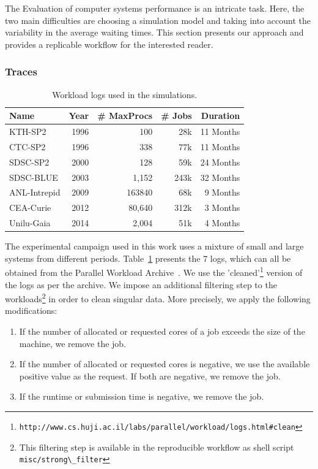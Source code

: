 \documentclass[sigconf]{acmart}
\newcommand{\ra}[1]{\renewcommand{\arraystretch}{#1}}
\begin{document}
The Evaluation of computer systems performance is an intricate
task\cite{feitbook}. Here, the two main difficulties are choosing a simulation
model and taking into account the variability in the average waiting times.
This section presents our approach and provides a replicable workflow
for the interested reader.

\subsubsection{Traces}
\label{sub:traces}

\begin{table}[ht]
  \centering
  \ra{1.3}
  \caption{Workload logs used in the simulations.}
  \label{tab:logs}
  \begin{tabular}{@{}lrrrr@{}}
    \hline
    Name          & Year & \# MaxProcs & \# Jobs & Duration\\
    \hline
    KTH-SP2       & 1996 & 100         & 28k     & 11 Months\\
    CTC-SP2       & 1996 & 338         & 77k     & 11 Months\\
    SDSC-SP2      & 2000 & 128         & 59k     & 24 Months\\
    SDSC-BLUE     & 2003 & 1,152       & 243k    & 32 Months\\
    ANL-Intrepid  & 2009 & 163840      & 68k     & 9  Months\\
    CEA-Curie     & 2012 & 80,640      & 312k    & 3  Months\\
    Unilu-Gaia    & 2014 & 2,004        & 51k     & 4  Months\\
    \hline
  \end{tabular}
\end{table}

The experimental campaign used in this work uses a mixture of small and large
systems from different periods. Table~\ref{tab:logs} presents the 7 logs, which
can all be obtained from the Parallel Workload
Archive~\cite{Feitelson20142967}. We use the 'cleaned'\footnote{\lstinline[basicstyle=\ttfamily\color{blue}]|http://www.cs.huji.ac.il/labs/parallel/workload/logs.html#clean|} version of the logs as
per the archive. We impose an additional
filtering step to the workloads\footnote{This filtering step is available in
the reproducible workflow\cite{repro} as shell script
\lstinline[basicstyle=\ttfamily\color{blue}]|misc/strong\_filter|} in order to
clean singular data. More precisely, we apply the following modifications:

\begin{enumerate}
  \item If the number of allocated or requested cores of a job  exceeds the size of the machine, we remove the job.
  \item If the number of allocated or requested cores is negative, we use the available positive value as the request. If both are negative, we remove the job.
  \item If the runtime or submission time is negative, we remove the job.
\end{enumerate}
\end{document}
